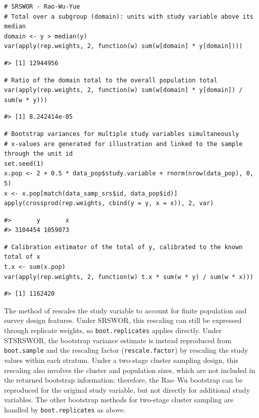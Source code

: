 \begin{verbatim}
# SRSWOR - Rao-Wu-Yue
# Total over a subgroup (domain): units with study variable above its median
domain <- y > median(y)
var(apply(rep.weights, 2, function(w) sum(w[domain] * y[domain])))
\end{verbatim}

\begin{verbatim}
#> [1] 12944956
\end{verbatim}

\begin{verbatim}
# Ratio of the domain total to the overall population total
var(apply(rep.weights, 2, function(w) sum(w[domain] * y[domain]) / sum(w * y)))
\end{verbatim}

\begin{verbatim}
#> [1] 8.242414e-05
\end{verbatim}

\begin{verbatim}
# Bootstrap variances for multiple study variables simultaneously
# x-values are generated for illustration and linked to the sample through the unit id
set.seed(1)
x.pop <- 2 + 0.5 * data_pop$study.variable + rnorm(nrow(data_pop), 0, 5)
x <- x.pop[match(data_samp_srs$id, data_pop$id)]
apply(crossprod(rep.weights, cbind(y = y, x = x)), 2, var)
\end{verbatim}

\begin{verbatim}
#>       y       x 
#> 3104454 1059073
\end{verbatim}

\begin{verbatim}
# Calibration estimator of the total of y, calibrated to the known total of x
t.x <- sum(x.pop)
var(apply(rep.weights, 2, function(w) t.x * sum(w * y) / sum(w * x)))
\end{verbatim}

\begin{verbatim}
#> [1] 1162420
\end{verbatim}

The method of \citet{Rao:Wu:1988} rescales the study variable to account for finite population and survey design features. Under SRSWOR, this rescaling can still be expressed through replicate weights, so \texttt{boot.replicates} applies directly. Under STSRSWOR, the bootstrap variance estimate is instead reproduced from \texttt{boot.sample} and the rescaling factor (\texttt{rescale.factor}) by rescaling the study values within each stratum.
Under a two-stage cluster sampling design, this rescaling also involves the cluster and population sizes, which are not included in the returned bootstrap information; therefore, the Rao--Wu bootstrap can be reproduced for the original study variable, but not directly for additional study variables. The other bootstrap methods for two-stage cluster sampling are handled by \texttt{boot.replicates} as above.

